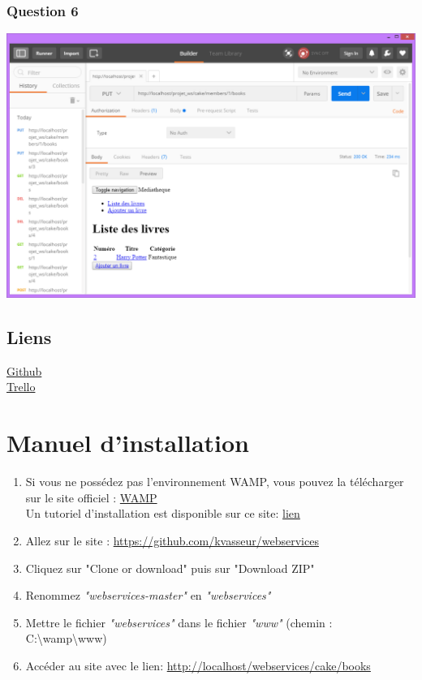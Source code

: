 \documentclass{report}
\begin{document}
		\subsection{Question 6}
		\begin{center}
			\includegraphics[scale=0.4]{img/resultats/q6.png} 
		\end{center} 
		
	\section{Liens}
		\href{https://github.com/kvasseur/webservices}{Github} \\
		\href{https://trello.com/b/A1vuuQZb/webservices-api-rest-mediatheque}{Trello}
	
	
	\chapter{Manuel d'installation}
	
	\begin{enumerate}
		\item Si vous ne poss\'{e}dez pas l'environnement WAMP, vous pouvez la t\'{e}l\'{e}charger sur le site officiel : \href{http://www.wampserver.com/}{WAMP}\\
		Un tutoriel d'installation est disponible sur ce site: \href{http://www.cndp.fr/crdp-dijon/Installer-et-configurer-Wampserver.html}{lien}
		\item Allez sur le site : \url{https://github.com/kvasseur/webservices}
		\item Cliquez sur "Clone or download" puis sur "Download ZIP"
		\item Renommez \textit{"webservices-master"} en \textit{"webservices"}
		\item Mettre le fichier \textit{"webservices"} dans le fichier \textit{"www"} (chemin : C:\textbackslash wamp\textbackslash www)
		\item Acc\'{e}der au site avec le lien: \url{http://localhost/webservices/cake/books}
	\end{enumerate}
	
\end{document}
